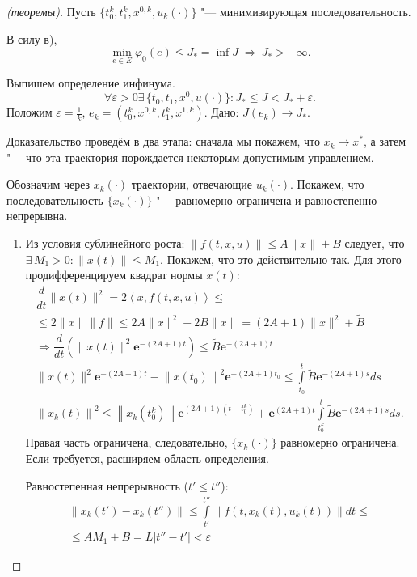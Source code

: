 \documentclass[12pt, a4paper]{article}
\theoremstyle{rusdef}
\newcommand\abs[1]{\left\lvert #1 \right\rvert} %
\newcommand{\e}{\mathbf{e}}
\newcommand{\norm}[1]{\left\lVert #1 \right\rVert} %
\DeclareMathOperator*{\thus}{\Rightarrow} %
\begin{document}
\begin{proof}[(теоремы)]
  Пусть $\{t_0^k, t_1^k, x^{0,k}, u_k(\cdot)\}$ "--- минимизирующая последовательность.

  В силу в),
  \[
    \min\limits_{e \in E} \varphi_0(e) \leqslant J_* = \inf J \;\thus\: J_* > -\infty.
  \]

  Выпишем определение инфинума.
  \[
    \forall \varepsilon > 0 \exists\,\{ t_0, t_1, x^0, u(\cdot) \} \colon J_* \leqslant J < J_* + \varepsilon.
  \]
  Положим $\varepsilon = \frac{1}{k}$, $e_k = (t_0^k, x^{0,k}, t_1^k, x^{1,k})$. Дано: $J(e_k) \to J_*$.

  Доказательство проведём в два этапа: сначала мы покажем, что $x_k \to x^*$, а затем "--- что эта траектория порождается некоторым допустимым управлением.

  Обозначим через $x_k(\cdot)$ траектории, отвечающие $u_k(\cdot)$. Покажем, что последовательность $\{x_k(\cdot)\}$ "--- равномерно ограничена и равностепенно непрерывна.

  \begin{enumerate}
    \item Из условия сублинейного роста: $\| f(t,x,u) \| \leqslant A \|x\| + B$ следует, что $\exists\, M_1 > 0 \colon \| x(t) \| \leqslant M_1$. Покажем, что это действительно так. Для этого продифференцируем квадрат нормы $x(t)$:
    \begin{gather*}
      \dfrac{d}{dt} \| x(t) \|^2 = 2 \left< x, f(t,x,u) \right> \leqslant \\
      \leqslant 2 \|x\| \|f\| \leqslant 2A \|x\|^2 + 2B \|x\| = (2A + 1) \|x\|^2 + \tilde{B} \\
      \thus \dfrac{d}{dt}\left(\|x(t)\|^2 \e^{-(2A+1)t}\right) \leqslant \tilde{B} \e^{-(2A + 1)t}\\
      \| x(t) \|^2 \e^{-(2A+1)t} - \norm{x(t_0)}^2 \e^{-(2A+1)t_0} \leqslant \int\limits_{t_0}^{t} \tilde{B} \e^{-(2A + 1)s} ds \\
      \norm{x_k(t)}^2 \leqslant \norm{x_k(t_0^k)} \e^{(2A + 1)(t - t_0^k)} + \e^{(2A + 1)t} \int\limits_{t_0^k}^{t} \tilde{B} \e^{-(2A + 1)s}ds.
    \end{gather*}
    Правая часть ограничена, следовательно, $\{x_k(\cdot)\}$ равномерно ограничена. Если требуется, расширяем область определения.
  
    Равностепенная непрерывность ($t' \leqslant t''$):
    \begin{gather*}
      \norm{x_k(t') - x_k(t'')} \leqslant \int\limits_{t'}^{t''} \norm{f(t, x_k(t), u_k(t))} dt \leqslant \\
      \leqslant A M_1 + B = L \abs{t'' - t'} < \varepsilon
    \end{gather*}
  

\end{enumerate}
\end{proof}
\end{document}
